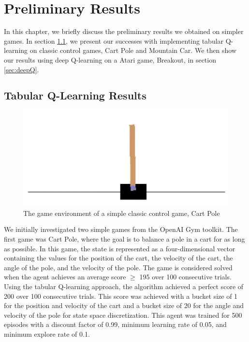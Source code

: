 \chapter{Preliminary Results}\label{Ch:ResultsPrelim}

In this chapter, we briefly discuss the preliminary results we obtained on simpler games. In section \ref{sec:tabQ}, we present our successes with implementing tabular Q-learning on classic control games, Cart Pole and Mountain Car. We then show our results using deep Q-learning on a Atari game, Breakout, in section \ref{sec:deepQ}.

\section{Tabular Q-Learning Results}\label{sec:tabQ}

\begin{figure}[h!]
\centering\includegraphics[scale=0.45,clip]{Graphics/cartpole.png}
\caption[Cart Pole]{The game environment of a simple classic control game, Cart Pole}
\label{fig:cartpole}
\end{figure}

We initially investigated two simple games from the OpenAI Gym toolkit. The first game was Cart Pole, where the goal is to balance a pole in a cart for as long as possible. In this game, the state is represented as a four-dimensional vector containing the values for the position of the cart, the velocity of the cart, the angle of the pole, and the velocity of the pole. The game is considered solved when the agent achieves an average score $\geq$ 195 over 100 consecutive trials. Using the tabular Q-learning approach, the algorithm achieved a perfect score of 200 over 100 consecutive trials. This score was achieved with a bucket size of 1 for the position and velocity of the cart and a bucket size of 20 for the angle and velocity of the pole for state space discretization. This agent was trained for 500 episodes with a discount factor of 0.99, minimum learning rate of 0.05, and minimum explore rate of 0.1.

